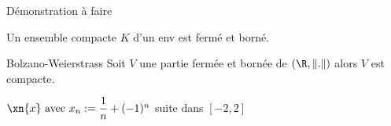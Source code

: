 \documentclass[a4paper, 12pt]{article}
\begin{document}
\begin{hotwarn}
    Démonstration à faire
\end{hotwarn}

\begin{proposition}{}{}
    Un ensemble compacte $K$ d'un env est fermé et borné.
\end{proposition}

\begin{theoreme}{Bolzano-Weierstrass}{}
    Soit $V$ une partie fermée et bornée de $(\R, \|.\|)$ alors $V$ est compacte.
\end{theoreme}

\begin{exemple}
    $\xn{x} \text{ avec } x_n := \dfrac{1}{n} + (-1)^n$ suite dans $[-2, 2]$
\end{exemple}
\end{document}
